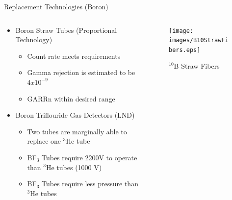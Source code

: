 \begin{frame}{Replacement Technologies (Boron)}
\begin{columns}[onlytextwidth]
\begin{column}{0.45\textwidth}
\begin{itemize}
	\small
	\item Boron Straw Tubes (Proportional Technology) \cite{kouzes_boron-lined_2012}
	\begin{itemize}
		\item Count rate meets requirements
		\item Gamma rejection is estimated to be $4x10^{-9}$
		\item GARRn within desired range
	\end{itemize}
	\small
	\item Boron Triflouride Gas Detectors (LND) \cite{kouzes_bf3_2009}
	\begin{itemize}
		\item Two tubes are marginally able to replace one ${}^3$He tube
		\item BF${}_3$ Tubes require 2200V to operate than ${}^3$He tubes (1000 V)
		\item BF${}_3$ Tubes require less pressure than ${}^3$He tubes
	\end{itemize}
\end{itemize}
\end{column}
\begin{column}{0.45\textwidth}
	\begin{figure}
	\centering
		\texttt{[image: images/B10StrawFibers.eps]}
		\caption{ ${}^{10}$B Straw Fibers}
		\label{fig:B10StrawFibers}

\end{figure}
\end{column}
\end{columns}
\end{frame}
